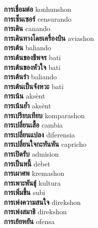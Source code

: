 \textbf{ การเชื่อมต่อ  } konhunshon \\
\textbf{ การเซ็นเซอร์  } censurando \\
\textbf{ การเดิน  } canando \\
\textbf{ การเดินทางโดยเครื่องบิน  } aviashon \\
\textbf{ การเต้น  } baliando \\
\textbf{ การเต้นของชีพจร  } bati \\
\textbf{ การเต้นของหัวใจ  } bati \\
\textbf{ การเต้นรำ  } baliando \\
\textbf{ การเต้นเป็นจังหวะ  } bati \\
\textbf{ การเน้น  } aksènt \\
\textbf{ การเน้นย้ำ  } aksènt \\
\textbf{ การเปรียบเทียบ  } komparashon \\
\textbf{ การเปลี่ยนเสื้อ  } cambia \\
\textbf{ การเปลี่ยนแปลง  } diferensia \\
\textbf{ การเปลี่ยนใจกะทันหัน  } capricho \\
\textbf{ การเปิดรับ  } admision \\
\textbf{ การเป็นหนี้  } debet \\
\textbf{ การเผาศพ  } kremashon \\
\textbf{ การเพาะพันธุ์  } kultura \\
\textbf{ การเพิ่มขึ้น  } subi \\
\textbf{ การเพ่งความสนใจ  } direkshon \\
\textbf{ การเพ่งสมาธิ  } direkshon \\
\textbf{ การเย้ยหยัน  } ofensa \\
